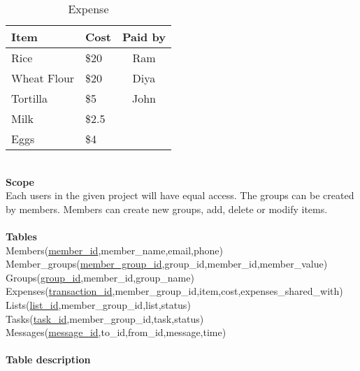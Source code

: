 \documentclass[11]{article}
\numberwithin{equation}{section}
\begin{document}
\begin{table}[h] %
\begin{center}
\caption{Expense }
	\begin{tabular}{| l | l | c |} %
	\hline
	Item & Cost & Paid by \\  %
	\hline
	Rice & \$20 & Ram \\  %
	\hline
		Wheat Flour & \$20 & Diya \\  %
	\hline
		Tortilla & \$5 & John \\  %
	\hline
		Milk & \$2.5 & \\  %
	\hline
		Eggs &  \$4 & \\  %
	\hline
	\end{tabular}
\end{center}
\end{table}
\fi
\ \\
\noindent \textbf{Scope} \\
Each users in the given project will have equal access. The groups can be created by members. Members can create new groups, add, delete or modify items. \\
\ \\
\noindent \textbf{Tables} \\
Members(\underline{member\_id},member\_name,email,phone) \\
Member\_groups(\underline{member\_group\_id},group\_id,member\_id,member\_value) \\
Groups(\underline{group\_id},member\_id,group\_name) \\
Expenses(\underline{transaction\_id},member\_group\_id,item,cost,expenses\_shared\_with) \\
Lists(\underline{list\_id},member\_group\_id,list,status) \\
Tasks(\underline{task\_id},member\_group\_id,task,status) \\
Messages(\underline{message\_id},to\_id,from\_id,message,time) \\
\ \\
\noindent \textbf{Table description} \\
\end{document}
